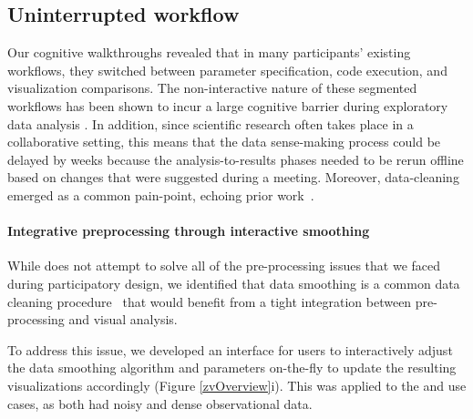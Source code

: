 \subsection{Uninterrupted workflow}
\par Our cognitive walkthroughs revealed that in many participants' existing workflows, they switched between parameter specification, code execution, and visualization comparisons. The non-interactive nature of these segmented workflows has been shown to incur a large cognitive barrier during exploratory data analysis \cite{Kery2017}. In addition, since scientific research often takes place in a collaborative setting, this means that the data sense-making process could be delayed by weeks because the analysis-to-results phases needed to be rerun offline based on changes that were suggested during a meeting. Moreover, data-cleaning emerged as a common pain-point, echoing prior work~\cite{kandel2012profiler,Guo2011}.
\paragraph{Integrative preprocessing through interactive smoothing} 
While \zv does not attempt to solve all of the pre-processing issues that we faced during participatory design, we identified that data smoothing is a common data cleaning procedure~\cite{simonoff2012smoothing} that would benefit from a tight integration between pre-processing and visual analysis.  
\par To address this issue, we developed an interface for users to interactively adjust the data smoothing algorithm and parameters on-the-fly to update the resulting visualizations accordingly (Figure \ref{zvOverview}i). This was applied to the \matsci and \astro use cases, as both had noisy and dense observational data. 
